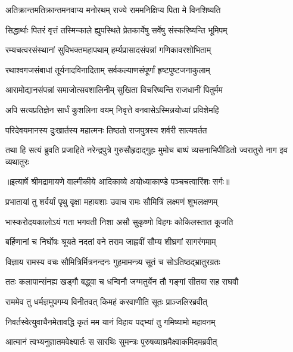 \twolineshloka
{अतिक्रान्तमतिक्रान्तमनवाप्य मनोरथम्}
{राज्ये राममनिक्षिप्य पिता मे विनशिष्यति} %

\twolineshloka
{सिद्धार्थाः पितरं वृत्तं तस्मिन्काले ह्युपस्थिते}
{प्रेतकार्येषु सर्वेषु संस्करिष्यन्ति भूमिपम्} %

\twolineshloka
{रम्यचत्वरसंस्थानां सुविभक्तमहापथाम्}
{हर्म्यप्रासादसंपन्नां गणिकावरशोभिताम्} %

\twolineshloka
{रथाश्वगजसंबाधां तूर्यनादविनादिताम्}
{सर्वकल्याणसंपूर्णां हृष्टपुष्टजनाकुलाम्} %

\twolineshloka
{आरामोद्यानसंपन्नां समाजोत्सवशालिनीम्}
{सुखिता विचरिष्यन्ति राजधानीं पितुर्मम} %

\twolineshloka
{अपि सत्यप्रतिज्ञेन सार्धं कुशलिना वयम्}
{निवृत्ते वनवासेऽस्मिन्नयोध्यां प्रविशेमहि} %

\twolineshloka
{परिदेवयमानस्य दुःखार्तस्य महात्मनः}
{तिष्ठतो राजपुत्रस्य शर्वरी सात्यवर्तत} %

\fourlineindentedshloka
{तथा हि सत्यं ब्रुवति प्रजाहिते}
{ नरेन्द्रपुत्रे गुरुसौहृदाद्गुहः}
{मुमोच बाष्पं व्यसनाभिपीडितो}
{ ज्वरातुरो नाग इव व्यथातुरः} %


{॥इत्यार्षे श्रीमद्रामायणे वाल्मीकीये आदिकाव्ये अयोध्याकाण्डे पञ्चचत्वारिंशः सर्गः॥}


\twolineshloka
{प्रभातायां तु शर्वर्यां पृथु वृक्षा महायशाः}
{उवाच रामः सौमित्रिं लक्ष्मणं शुभलक्षणम्} %

\twolineshloka
{भास्करोदयकालोऽयं गता भगवती निशा}
{असौ सुकृष्णो विहगः कोकिलस्तात कूजति} %

\twolineshloka
{बर्हिणानां च निर्घोषः श्रूयते नदतां वने}
{तराम जाह्नवीं सौम्य शीघ्रगां सागरंगमाम्} %

\twolineshloka
{विज्ञाय रामस्य वचः सौमित्रिर्मित्रनन्दनः}
{गुहमामन्त्र्य सूतं च सोऽतिष्ठद्भ्रातुरग्रतः} %

\twolineshloka
{ततः कलापान्संनह्य खड्गौ बद्ध्वा च धन्विनौ}
{जग्मतुर्येन तौ गङ्गां सीतया सह राघवौ} %

\twolineshloka
{राममेव तु धर्मज्ञमुपगम्य विनीतवत्}
{किमहं करवाणीति सूतः प्राञ्जलिरब्रवीत्} %

\twolineshloka
{निवर्तस्वेत्युवाचैनमेतावद्धि कृतं मम}
{यानं विहाय पद्भ्यां तु गमिष्यामो महावनम्} %

\twolineshloka
{आत्मानं त्वभ्यनुज्ञातमवेक्ष्यार्तः स सारथिः}
{सुमन्त्रः पुरुषव्याघ्रमैक्ष्वाकमिदमब्रवीत्} %

